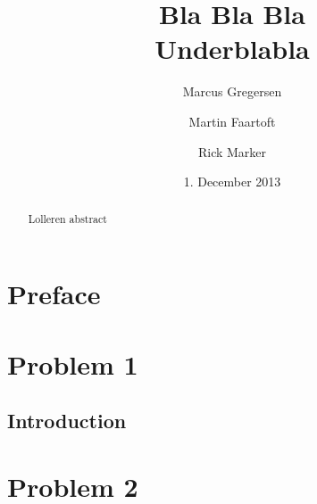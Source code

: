 \documentclass[a4paper,11pt]{article}
\begin{document}
\date{1. December 2013}
\title{Bla Bla Bla\\Underblabla}
\author{Marcus Gregersen\and Martin Faartoft\and Rick Marker}
\clearpage\maketitle
\thispagestyle{empty}
\begin{abstract}
Lolleren abstract
\end{abstract}
\newpage
\setcounter{page}{1}
\section{Preface}
\section{Problem 1}
\subsection{Introduction}
\label{sub:part1-intro}

\section{Problem 2}
\end{document}
